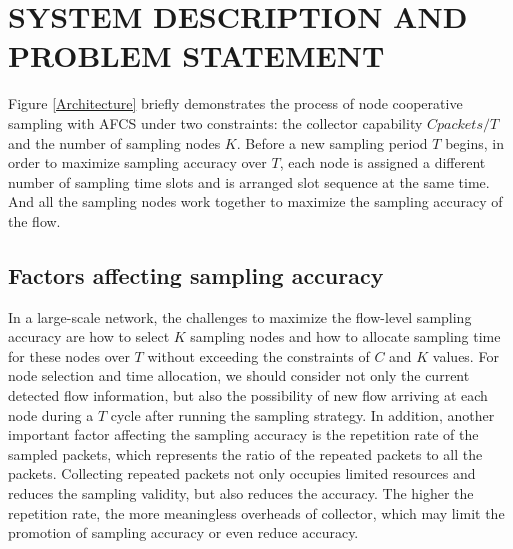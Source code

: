 \documentclass[conference]{IEEEtran}
\begin{document}
\section{SYSTEM DESCRIPTION AND PROBLEM STATEMENT }

Figure \ref{Architecture} briefly demonstrates the process of node cooperative sampling with AFCS under two constraints: the collector capability $C packets/T$ and the number of sampling nodes $K$. 
Before a new sampling period $T$ begins, in order to maximize sampling accuracy over $T$, each node is assigned a different number of sampling time slots and is arranged slot sequence at the same time.
And all the sampling nodes work together to maximize the sampling accuracy of the flow. %
\subsection{Factors affecting sampling accuracy}
In a large-scale network, the challenges to maximize the flow-level sampling accuracy are how to select $K$ sampling nodes and how to allocate sampling time for these nodes over $T$ without exceeding the constraints of $C$ and $K$ values.  %
For node selection and time allocation, we should  consider not only the current detected flow information, but also the possibility of new flow arriving at each node during a $T$ cycle after running the sampling strategy. %
In addition, another important factor affecting the sampling accuracy is the repetition rate of the sampled packets, which represents the ratio of the repeated packets to all the packets.
Collecting repeated packets not only occupies limited resources and reduces the sampling validity, but also reduces the  accuracy.  %
The higher the repetition rate, the more meaningless  overheads of collector, which may limit the promotion of sampling accuracy or even reduce accuracy. %
\end{document}
